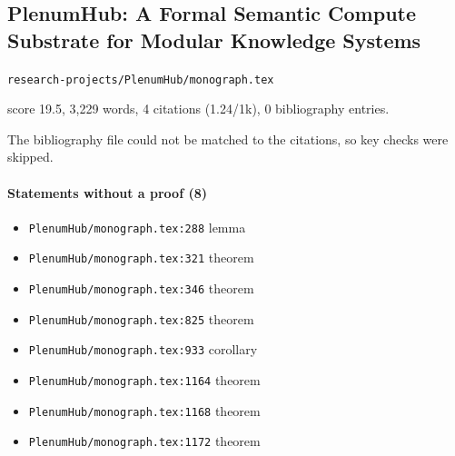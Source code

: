 \documentclass[11pt]{article}
\newcommand{\loc}[1]{{\small\color{muted}\texttt{#1}}}
\begin{document}
\subsection{PlenumHub: A Formal Semantic Compute Substrate for Modular Knowledge Systems}
\loc{research-projects/\allowbreak{}PlenumHub/\allowbreak{}monograph.tex}\par
score 19.5, 3,229 words, 4 citations (1.24/1k), 0 bibliography entries.

The bibliography file could not be matched to the citations, so key checks were skipped.

\paragraph{Statements without a proof (8)}
\begin{itemize}
\item \loc{PlenumHub/\allowbreak{}monograph.tex:288} lemma
\item \loc{PlenumHub/\allowbreak{}monograph.tex:321} theorem
\item \loc{PlenumHub/\allowbreak{}monograph.tex:346} theorem
\item \loc{PlenumHub/\allowbreak{}monograph.tex:825} theorem
\item \loc{PlenumHub/\allowbreak{}monograph.tex:933} corollary
\item \loc{PlenumHub/\allowbreak{}monograph.tex:1164} theorem
\item \loc{PlenumHub/\allowbreak{}monograph.tex:1168} theorem
\item \loc{PlenumHub/\allowbreak{}monograph.tex:1172} theorem
\end{itemize}
\end{document}
